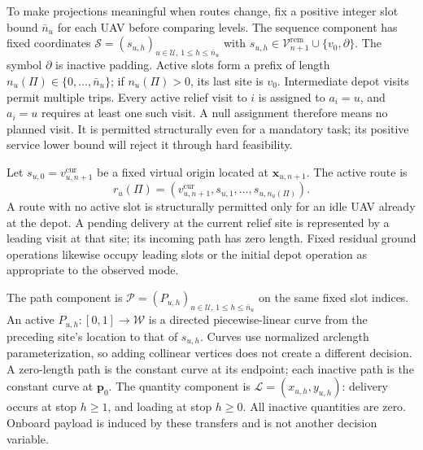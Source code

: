 To make projections meaningful when routes change, fix a positive integer
slot bound $\bar n_u$ for each UAV before comparing levels.
The sequence component has fixed coordinates
$\mathcal S=(s_{u,h})_{u\in\mathcal U,\,1\le h\le\bar n_u}$ with
$s_{u,h}\in\mathcal V_{n+1}^{\mathrm{rem}}\cup\{v_0,\partial\}$.
The symbol $\partial$ is inactive padding. Active slots form a prefix of
length $n_u(\Pi)\in\{0,\ldots,\bar n_u\}$; if $n_u(\Pi)>0$, its last site is
$v_0$. Intermediate depot visits permit multiple trips. Every active
relief visit to $i$ is assigned to $a_i=u$, and $a_i=u$ requires at least
one such visit. A null assignment therefore means no planned visit.
It is permitted structurally even for a mandatory task; its positive service
lower bound will reject it through hard feasibility.

Let $s_{u,0}=v_{u,n+1}^{\mathrm{cur}}$ be a fixed virtual origin located at
$\mathbf x_{u,n+1}$. The active route is
\begin{equation}
r_u(\Pi)=(v_{u,n+1}^{\mathrm{cur}},s_{u,1},\ldots,s_{u,n_u(\Pi)}).
\label{eq:current_state_route}
\end{equation}
A route with no active slot is structurally permitted only for an idle UAV
already at the depot. A pending delivery at the current relief site is
represented by a leading visit at that site; its incoming path has zero
length. Fixed residual ground operations likewise occupy leading slots or
the initial depot operation as appropriate to the observed mode.

The path component is
$\mathcal P=(P_{u,h})_{u\in\mathcal U,\,1\le h\le\bar n_u}$ on the same
fixed slot indices. An active $P_{u,h}:[0,1]\to\mathcal W$ is a directed
piecewise-linear curve from the preceding site's location to that of
$s_{u,h}$. Curves use normalized arclength parameterization, so adding
collinear vertices does not create a different decision. A zero-length
path is the constant curve at its endpoint; each inactive path is the
constant curve at $\mathbf p_0$. The quantity component is
$\mathcal L=(x_{u,h},y_{u,h})$: delivery occurs at stop $h\ge1$, and
loading at stop $h\ge0$. All inactive quantities are zero. Onboard payload
is induced by these transfers and is not another decision variable.


